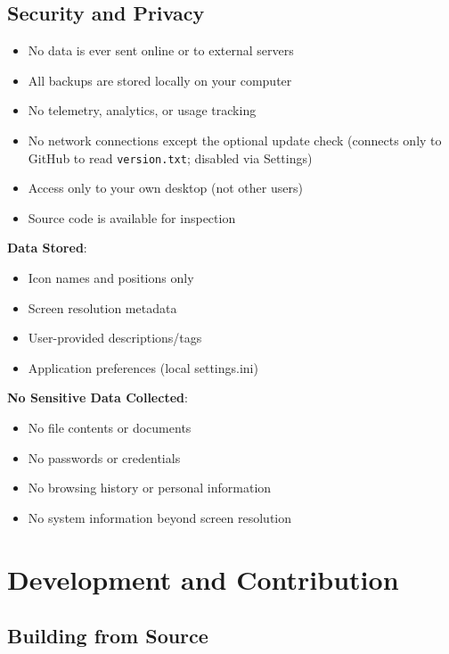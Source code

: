 \documentclass[a4paper,11pt]{article}
\begin{document}
\subsection{Security and Privacy}

\begin{infobox}
  \begin{itemize}
    \item No data is ever sent online or to external servers
    \item All backups are stored locally on your computer
    \item No telemetry, analytics, or usage tracking
    \item No network connections except the optional update check
      (connects only to GitHub to read \texttt{version.txt};
      disabled via Settings)
    \item Access only to your own desktop (not other users)
    \item Source code is available for inspection
  \end{itemize}
\end{infobox}

\textbf{Data Stored}:
\begin{itemize}
  \item Icon names and positions only
  \item Screen resolution metadata
  \item User-provided descriptions/tags
  \item Application preferences (local settings.ini)
\end{itemize}

\textbf{No Sensitive Data Collected}:
\begin{itemize}
  \item No file contents or documents
  \item No passwords or credentials
  \item No browsing history or personal information
  \item No system information beyond screen resolution
\end{itemize}

\section{Development and Contribution}

\subsection{Building from Source}
\end{document}
